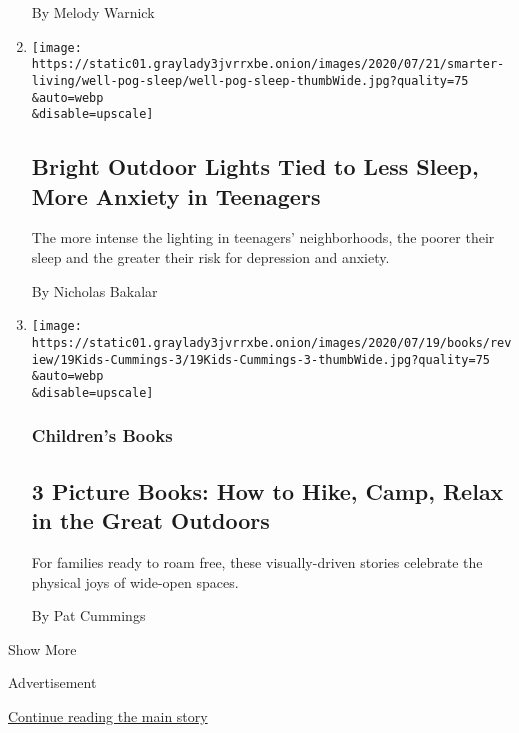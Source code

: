 \begin{enumerate}
  By Melody Warnick
\item
  \href{/2020/07/13/well/mind/bright-outdoor-lights-tied-to-less-sleep-more-anxiety-in-teenagers.html}{}

  \texttt{[image: https://static01.graylady3jvrrxbe.onion/images/2020/07/21/smarter-living/well-pog-sleep/well-pog-sleep-thumbWide.jpg?quality=75\\\&auto=webp\\\&disable=upscale]}

  \hypertarget{bright-outdoor-lights-tied-to-less-sleep-more-anxiety-in-teenagers}{%
  \subsection{Bright Outdoor Lights Tied to Less Sleep, More Anxiety in
  Teenagers}\label{bright-outdoor-lights-tied-to-less-sleep-more-anxiety-in-teenagers}}

  The more intense the lighting in teenagers' neighborhoods, the poorer
  their sleep and the greater their risk for depression and anxiety.

  By Nicholas Bakalar
\item
  \href{/2020/07/11/books/picture-books-the-camping-trip-jennifer-k-mann.html}{}

  \texttt{[image: https://static01.graylady3jvrrxbe.onion/images/2020/07/19/books/review/19Kids-Cummings-3/19Kids-Cummings-3-thumbWide.jpg?quality=75\\\&auto=webp\\\&disable=upscale]}

  \hypertarget{childrens-books}{%
  \subsubsection{Children's Books}\label{childrens-books}}

  \hypertarget{3-picture-books-how-to-hike-camp-relax-in-the-great-outdoors}{%
  \subsection{3 Picture Books: How to Hike, Camp, Relax in the Great
  Outdoors}\label{3-picture-books-how-to-hike-camp-relax-in-the-great-outdoors}}

  For families ready to roam free, these visually-driven stories
  celebrate the physical joys of wide-open spaces.

  By Pat Cummings
\end{enumerate}

Show More

Advertisement

\protect\hyperlink{after-mid3}{Continue reading the main story}

